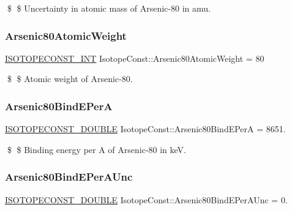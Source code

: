 \$ \$ Uncertainty in atomic mass of Arsenic-\/80 in amu. \mbox{\label{group___isotope_const-_arsenic-_as80_ga0d2a708f59ef66e1703c7ef496aeca1c}} 
\subsubsection{\texorpdfstring{Arsenic80\+Atomic\+Weight}{Arsenic80AtomicWeight}}
{\footnotesize\ttfamily \mbox{\hyperlink{group___isotope_const-_macros_ga5f18360b3e99483a35c32d789e62621c}{I\+S\+O\+T\+O\+P\+E\+C\+O\+N\+S\+T\+\_\+\+I\+NT}} Isotope\+Const\+::\+Arsenic80\+Atomic\+Weight = 80}

\$ \$ Atomic weight of Arsenic-\/80. \mbox{\label{group___isotope_const-_arsenic-_as80_ga8ae9213dcfc71e8c8485a595bba25311}} 
\subsubsection{\texorpdfstring{Arsenic80\+Bind\+E\+PerA}{Arsenic80BindEPerA}}
{\footnotesize\ttfamily \mbox{\hyperlink{group___isotope_const-_macros_ga8f45a7272ce02c0b4c65c44636ed719a}{I\+S\+O\+T\+O\+P\+E\+C\+O\+N\+S\+T\+\_\+\+D\+O\+U\+B\+LE}} Isotope\+Const\+::\+Arsenic80\+Bind\+E\+PerA = 8651.}

\$ \$ Binding energy per A of Arsenic-\/80 in keV. \mbox{\label{group___isotope_const-_arsenic-_as80_ga525359726b8811baa3ae67a3763892a6}} 
\subsubsection{\texorpdfstring{Arsenic80\+Bind\+E\+Per\+A\+Unc}{Arsenic80BindEPerAUnc}}
{\footnotesize\ttfamily \mbox{\hyperlink{group___isotope_const-_macros_ga8f45a7272ce02c0b4c65c44636ed719a}{I\+S\+O\+T\+O\+P\+E\+C\+O\+N\+S\+T\+\_\+\+D\+O\+U\+B\+LE}} Isotope\+Const\+::\+Arsenic80\+Bind\+E\+Per\+A\+Unc = 0.}

